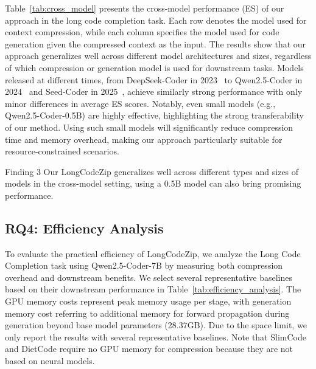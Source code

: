 \documentclass[10pt,conference]{IEEEtran}
\newcommand{\edit}[1]{{\color{black}#1}}
\newcommand{\todoc}[2]{{\textcolor{#1}{\textbf{[#2]}}}}
\newcommand{\shi}[1]{\todoc{orange}{Shi: #1}}
\newcommand{\approach}{{LongCodeZip}\xspace} %
\begin{document}
Table~\ref{tab:cross_model} presents the cross-model performance (ES) of our approach in the long code completion task.
Each row denotes the model used for context compression, while each column specifies the model used for code generation given the compressed context as the input. The results show that our approach generalizes well across different model architectures and sizes, regardless of which compression or generation model is used for downstream tasks. Models released at different times, from DeepSeek-Coder in 2023~\cite{guo2024deepseek} to Qwen2.5-Coder in 2024~\cite{hui2024qwen2} and Seed-Coder in 2025~\cite{zhang2025seed}, achieve similarly strong performance with only minor differences in average ES scores. Notably, even small models (e.g., Qwen2.5-Coder-0.5B) are highly effective, highlighting the strong transferability of our method. \edit{Using such small models will significantly reduce compression time and memory overhead, making our approach particularly suitable for resource-constrained scenarios.}

\begin{finding}{Finding 3}
    Our \approach generalizes well across different types and sizes of models in the cross-model setting, using a 0.5B model can also bring promising performance.
\end{finding}

\subsection{RQ4: Efficiency Analysis}
To evaluate the practical efficiency of \approach, we analyze the Long Code Completion task using Qwen2.5-Coder-7B by measuring both compression overhead and downstream benefits. We select several representative baselines based on their downstream performance in Table~\ref{tab:efficiency_analysis}. 
The GPU memory costs represent peak memory usage per stage, with generation memory cost referring to additional memory for forward propagation during generation beyond base model parameters (28.37GB). Due to the space limit, we only report the results with several representative baselines. Note that SlimCode and DietCode require no GPU memory for compression because they are not based on neural models.
\end{document}
